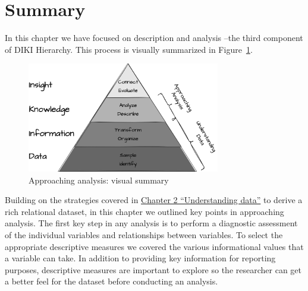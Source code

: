 \documentclass[
  letterpaper,
  DIV=11,
  numbers=noendperiod]{scrreport}
\theoremstyle{definition}
\theoremstyle{remark}
\begin{document}
\hypertarget{summary-2}{%
\section*{Summary}\label{summary-2}}


In this chapter we have focused on description and analysis --the third
component of DIKI Hierarchy. This process is visually summarized in
Figure~\ref{fig-approaching-analysis-vis-sum}.

\begin{figure}[H]

{\centering \includegraphics[width=0.75\textwidth,height=\textheight]{figures/approaching-analysis/aa-diki.drawio.png}

}

\caption{\label{fig-approaching-analysis-vis-sum}Approaching analysis:
visual summary}

\end{figure}

Building on the strategies covered in
\protect\hyperlink{sec-understanding-data}{Chapter 2 ``Understanding
data''} to derive a rich relational dataset, in this chapter we outlined
key points in approaching analysis. The first key step in any analysis
is to perform a diagnostic assessment of the individual variables and
relationships between variables. To select the appropriate descriptive
measures we covered the various informational values that a variable can
take. In addition to providing key information for reporting purposes,
descriptive measures are important to explore so the researcher can get
a better feel for the dataset before conducting an analysis.
\end{document}
